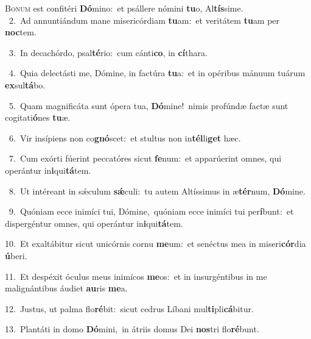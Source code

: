 \lettrine{\initial\textcolor{\initialcolor}{B}}{onum} est confitéri \textbf{Dó}\-mino:~\star et psállere nómini \textbf{tu}\-o, Al\-\textbf{tís}\-sime.\\
{\numbfont\textcolor{\numbcolor}{~2.}}~Ad annuntiándum mane misericórdiam \textbf{tu}\-am:~\star et veritátem \textbf{tu}\-am per \textbf{noc}\-tem.\par
{\numbfont\textcolor{\numbcolor}{~3.}}~In decachórdo, psal\-\textbf{té}\-rio:~\star cum cánti\-\textbf{co}\-, in \textbf{cí}\-thara.\par
{\numbfont\textcolor{\numbcolor}{~4.}}~Quia delectásti me, Dómine, in factúra \textbf{tu}\-a:~\star et in opéribus mánuum tuárum \textbf{ex}\-sul\-\textbf{tá}\-bo.\par
{\numbfont\textcolor{\numbcolor}{~5.}}~Quam magnificáta sunt ópera tua, \textbf{Dó}\-mine!~\star nimis profúndæ factæ sunt cogitati\-\textbf{ó}\-nes \textbf{tu}\-æ.\par
{\numbfont\textcolor{\numbcolor}{~6.}}~Vir insípiens non co\-\textbf{gnó}\-scet:~\star et stultus non in\-\textbf{tél}\-li\textbf{get} hæc.\par
{\numbfont\textcolor{\numbcolor}{~7.}}~Cum exórti fúerint peccatóres sicut \textbf{fe}\-num:~\star et apparúerint omnes, qui operántur in\-\textbf{i}\-qui\-\textbf{tá}\-tem.\par
{\numbfont\textcolor{\numbcolor}{~8.}}~Ut intéreant in sǽculum \textbf{sǽ}\-culi:~\star tu autem Altíssimus in æ\-\textbf{tér}\-num, \textbf{Dó}\-mine.\par
{\numbfont\textcolor{\numbcolor}{~9.}}~Quóniam ecce inimíci tui, Dómine,~\dagger quóniam ecce inimíci tui per\-\textbf{í}\-bunt:~\star et dispergéntur omnes, qui operántur in\-\textbf{i}\-qui\-\textbf{tá}\-tem.\par
{\numbfont\textcolor{\numbcolor}{10.}}~Et exaltábitur sicut unicórnis cornu \textbf{me}\-um:~\star et senéctus mea in miseri\-\textbf{cór}\-dia \textbf{ú}\-beri.\par
{\numbfont\textcolor{\numbcolor}{11.}}~Et despéxit óculus meus inimícos \textbf{me}\-os:~\star et in insurgéntibus in me malignántibus áudiet \textbf{au}\-ris \textbf{me}\-a.\par
{\numbfont\textcolor{\numbcolor}{12.}}~Justus, ut palma flo\-\textbf{ré}\-bit:~\star sicut cedrus Líbani mul\-\textbf{ti}\-pli\-\textbf{cá}\-bitur.\par
{\numbfont\textcolor{\numbcolor}{13.}}~Plantáti in domo \textbf{Dó}\-mini,~\star in átriis domus Dei \textbf{nos}\-tri flo\-\textbf{ré}\-bunt.\par

